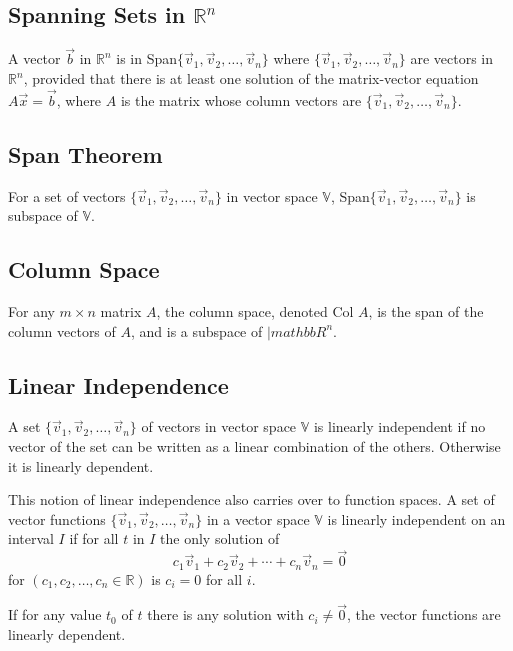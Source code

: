     \subsection{Spanning Sets in $\mathbb{R}^n$}
    A vector $\vec{b}$ in $\mathbb{R}^n$ is in Span$\{\vec{v}_1, \vec{v}_2, \ldots, \vec{v}_n\}$ where $\{\vec{v}_1, \vec{v}_2, \ldots, \vec{v}_n\}$ are vectors in $\mathbb{R}^n$, provided that there is at least one solution of the matrix-vector equation $A\vec{x} = \vec{b}$, where $A$ is the matrix whose column vectors are $\{\vec{v}_1, \vec{v}_2, \ldots, \vec{v}_n\}$.

    \subsection{Span Theorem}
    For a set of vectors $\{\vec{v}_1, \vec{v}_2, \ldots, \vec{v}_n\}$ in vector space $\mathbb{V}$, Span$\{\vec{v}_1, \vec{v}_2, \ldots, \vec{v}_n\}$ is subspace of $\mathbb{V}$.

    \subsection{Column Space}
    For any $m \times n$ matrix $A$, the column space, denoted Col $A$, is the span of the column vectors of $A$, and is a subspace of $|mathbb{R}^n$.

    \subsection{Linear Independence}
    A set $\{\vec{v}_1, \vec{v}_2, \ldots, \vec{v}_n\}$ of vectors in vector space $\mathbb{V}$ is linearly independent if no vector of the set can be written as a linear combination of the others. Otherwise it is linearly dependent.

    This notion of linear independence also carries over to function spaces. A set of vector functions $\{\vec{v}_1, \vec{v}_2, \ldots, \vec{v}_n\}$ in a vector space $\mathbb{V}$ is linearly independent on an interval $I$ if for all $t$ in $I$ the only solution of
    \[
    c_1 \vec{v}_1 + c_2 \vec{v}_2 + \cdots + c_n \vec{v}_n = \vec{0}
    \]
    for $(c_1, c_2, \ldots, c_n \in \mathbb{R})$ is $c_i = 0$ for all $i$.

    If for any value $t_0$ of $t$ there is any solution with $c_i \neq \vec{0}$, the vector functions are linearly dependent.



